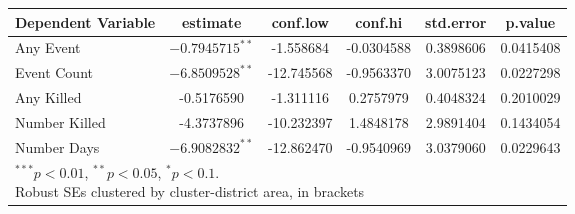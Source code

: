 \begin{tabular}[t]{l c c c c c}
\hline
Dependent Variable & estimate & conf.low & conf.hi & std.error & p.value\\
\hline
Any Event & $-0.7945715^{**}$ & -1.558684 & -0.0304588 & 0.3898606 & 0.0415408\\
Event Count & $-6.8509528^{**}$ & -12.745568 & -0.9563370 & 3.0075123 & 0.0227298\\
Any Killed & -0.5176590 & -1.311116 & 0.2757979 & 0.4048324 & 0.2010029\\
Number Killed & -4.3737896 & -10.232397 & 1.4848178 & 2.9891404 & 0.1434054\\
Number Days & $-6.9082832^{**}$ & -12.862470 & -0.9540969 & 3.0379060 & 0.0229643\\
\hline
\multicolumn{6}{l}{\scriptsize{\parbox{.4\linewidth}{\vspace{2pt}$^{***}p<0.01$, $^{**}p<0.05$, $^*p<0.1$. \\
      Robust SEs clustered by cluster-district area, in brackets\\}}}
\end{tabular}
